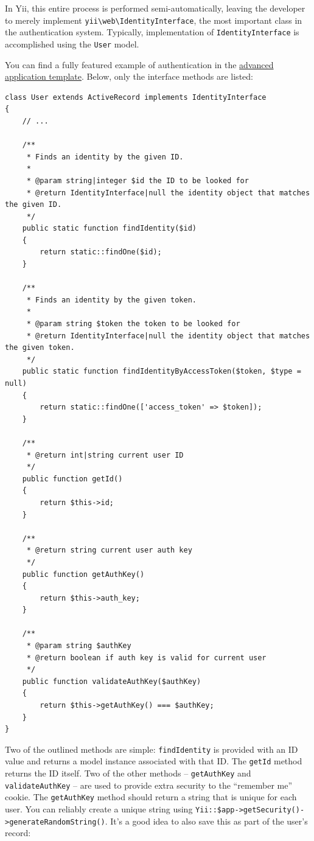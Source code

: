 In Yii, this entire process is performed semi-automatically, leaving the developer to merely implement \texttt{yii{\allowbreak{}\textbackslash}web{\allowbreak{}\textbackslash}IdentityInterface}, the most important class in the authentication system. Typically, implementation of \lstinline|IdentityInterface| is accomplished using the \lstinline|User| model.

You can find a fully featured example of authentication in the
\hyperref[tutorial-advanced-app.md]{advanced application template}. Below, only the interface methods are listed:

\lstset{language=php}\begin{lstlisting}
class User extends ActiveRecord implements IdentityInterface
{
    // ...

    /**
     * Finds an identity by the given ID.
     *
     * @param string|integer $id the ID to be looked for
     * @return IdentityInterface|null the identity object that matches the given ID.
     */
    public static function findIdentity($id)
    {
        return static::findOne($id);
    }

    /**
     * Finds an identity by the given token.
     *
     * @param string $token the token to be looked for
     * @return IdentityInterface|null the identity object that matches the given token.
     */
    public static function findIdentityByAccessToken($token, $type = null)
    {
        return static::findOne(['access_token' => $token]);
    }

    /**
     * @return int|string current user ID
     */
    public function getId()
    {
        return $this->id;
    }

    /**
     * @return string current user auth key
     */
    public function getAuthKey()
    {
        return $this->auth_key;
    }

    /**
     * @param string $authKey
     * @return boolean if auth key is valid for current user
     */
    public function validateAuthKey($authKey)
    {
        return $this->getAuthKey() === $authKey;
    }
}
\end{lstlisting}
Two of the outlined methods are simple: \lstinline|findIdentity| is provided with an  ID value and returns a model instance
associated with that ID. The \lstinline|getId| method returns the ID itself. Two of the other methods – \lstinline|getAuthKey| and
\lstinline|validateAuthKey| – are used to provide extra security to the ``remember me'' cookie. The \lstinline|getAuthKey| method should
return a string that is unique for each user. You can reliably create a unique string using
\lstinline|Yii::$app->getSecurity()->generateRandomString()|. It's a good idea to also save this as part of the user's record:

